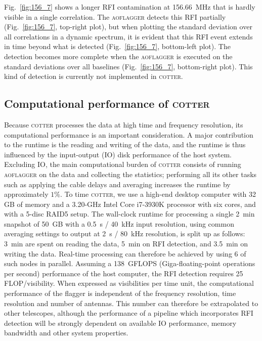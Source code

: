 \documentclass{pasa}
\begin{document}
Fig.~\ref{fig:156_7} shows a longer RFI contamination at 156.66~MHz that is hardly visible in a single correlation. The \textsc{aoflagger} detects this RFI partially (Fig.~\ref{fig:156_7}, top-right plot), but when plotting the standard deviation over all correlations in a dynamic spectrum, it is evident that this RFI event extends in time beyond what is detected (Fig.~\ref{fig:156_7}, bottom-left plot). The detection becomes more complete when the \textsc{aoflagger} is executed on the standard deviations over all baselines (Fig.~\ref{fig:156_7}, bottom-right plot). This kind of detection is currently not implemented in \textsc{cotter}.

\subsection{Computational performance of \textsc{cotter}}
Because \textsc{cotter} processes the data at high time and frequency resolution, its computational performance is an important consideration. A major contribution to the runtime is the reading and writing of the data, and the runtime is thus influenced by the input-output (IO) disk performance of the host system. Excluding IO, the main computational burden of \textsc{cotter} consists of running \textsc{aoflagger} on the data and collecting the statistics; performing all its other tasks such as applying the cable delays and averaging increases the runtime by approximately $1\%$. To time \textsc{cotter}, we use a high-end desktop computer with 32 GB of memory and a 3.20-GHz Intel Core i7-3930K processor with six cores, and with a 5-disc RAID5 setup. The wall-clock runtime for processing a single 2~min snapshot of 50~GB with a 0.5~s / 40~kHz input resolution, using common averaging settings to output at 2~s / 80~kHz resolution, is split up as follows: 3~min are spent on reading the data, 5~min on RFI detection, and 3.5~min on writing the data. Real-time processing can therefore be achieved by using 6 of such nodes in parallel. Assuming a 138~GFLOPS (Giga-floating-point operations per second) performance of the host computer, the RFI detection requires 25 FLOP/visibility. When expressed as visibilities per time unit, the computational performance of the flagger is independent of the frequency resolution, time resolution and number of antennas. This number can therefore be extrapolated to other telescopes, although the performance of a pipeline which incorporates RFI detection will be strongly dependent on available IO performance, memory bandwidth and other system properties.
\end{document}
